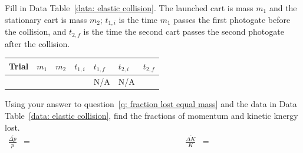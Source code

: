 \documentclass[addpoints]{physlabs}
\begin{document}
\begin{postlab}
\begin{parts}
\begin{solution}[2cm]
        \end{solution}
    \end{parts}

    \filbreak
    \question[1] Fill in Data Table~\ref{data: elastic collision}. The launched cart is mass $m_1$ and the stationary cart is mass $m_2$; $t_{1,i}$ is the time $m_1$ passes the first photogate before the collision, and $t_{2,f}$ is the time the second cart passes the second photogate after the collision.
    \begin{center}
        \captionsetup{font=normalsize}
        \renewcommand{\arraystretch}{2}
        \begin{tabular}{|>{\centering\arraybackslash}p{1.5cm}|>{\centering\arraybackslash}p{1.5cm}|>{\centering\arraybackslash}p{1.5cm}|>{\centering\arraybackslash}p{1.5cm}|>{\centering\arraybackslash}p{1.5cm}|>{\centering\arraybackslash}p{1.5cm}|>{\centering\arraybackslash}p{1.5cm}|}
        \hline
        \rowcolor{gray!20}
        Trial & $m_1$ & $m_2$ & $t_{1,i}$ & $t_{1,f}$ & $t_{2,i}$ & $t_{2,f}$
        \\
        \hline
        1 & & & & N/A & N/A & \\ \hline
        \end{tabular}
    \end{center}
    \begin{solution}[1cm]
            
    \end{solution}

    \filbreak
    \question[1] \label{q: fraction lost elastic} Using your answer to question~\ref{q: fraction lost equal mass} and the data in Data Table~\ref{data: elastic collision}, find the fractions of momentum and kinetic knergy lost. 
    \begin{align*}
        \frac{\overline{\Delta p}}{p} &= \qquad\qquad\qquad\qquad\qquad\qquad\qquad\qquad\qquad
        &
        \frac{\overline{\Delta K}}{K} &= \qquad\qquad\qquad\qquad\qquad\qquad\qquad\qquad\qquad
        \\
    \end{align*}
    \begin{solution}[1cm]
            
    \end{solution}


\end{postlab}
\end{document}

